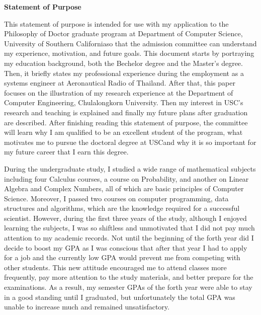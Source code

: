 \documentclass[a4paper,12pt]{report}
\newcommand{\university}{University of Southern California}
\newcommand{\department}{Department of Computer Science}
\newcommand{\uniabbre}{USC}
\begin{document}
\begin{center}
\textbf{\large Statement of Purpose}
\end{center}

\vspace{0.4cm}
This statement of purpose is intended for use with my application to the Philosophy of Doctor graduate program at \department, \university \space so that the admission committee can understand my experience, motivation, and future goals. This document starts by portraying my education background, both the Bechelor degree and the Master's degree. Then, it briefly states my professional experience during the employment as a systems engineer at Aeronautical Radio of Thailand. After that, this paper focuses on the illustration of my research experience at the Department of Computer Engineering, Chulalongkorn University. Then my interest in \uniabbre's research and teaching is explained and finally my future plans after graduation are described. After finishing reading this statement of purpose, the committee will learn why I am qualified to be an excellent student of the program, what motivates me to pursue the doctoral degree at \uniabbre \space and why it is so important for my future career that I earn this degree.

\vspace{0.2cm}
During the undergraduate study, I studied a wide range of mathematical subjects including four Calculus courses, a course on Probability, and another on Linear Algebra and Complex Numbers, all of which are basic principles of Computer Science. Moreover, I passed two courses on computer programming, data structures and algorithms, which are the knowledge required for a successful scientist. However, during the first three years of the study, although I enjoyed learning the subjects, I was so shiftless and unmotivated that I did not pay much attention to my academic records. Not until the beginning of the forth year did I decide to boost my GPA as I was conscious that after that year I had to apply for a job and the currently low GPA would prevent me from competing with other students. This new attitude encouraged me to attend classes more frequently, pay more attention to the study materials, and better prepare for the examinations. As a result, my semester GPAs of the forth year were able to stay in a good standing until I graduated, but unfortunately the total GPA was unable to increase much and remained unsatisfactory. 
\end{document}
